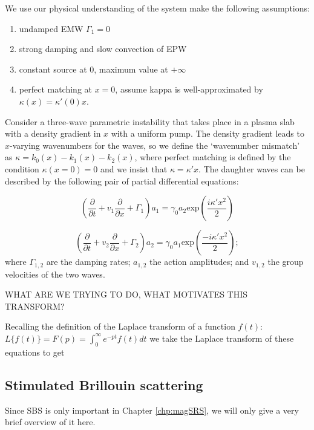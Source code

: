 We use our physical understanding of the system make the following assumptions:
\begin{enumerate}
	\item undamped EMW $\Gamma_1 = 0$
	\item strong damping and slow convection of EPW
	\item constant source at 0, maximum value at $+\infty$
	\item perfect matching at $x=0$, assume kappa is well-approximated by 
	$\kappa(x) = \kappa'(0)x$.
\end{enumerate}

Consider a three-wave parametric instability that takes place in a plasma slab with a density gradient in $x$ with a uniform pump. The density gradient leads to $x$-varying wavenumbers for the waves, so we define the `wavenumber mismatch' as $\kappa = k_0(x) - k_1(x) - k_2(x)$, where perfect matching is defined by the condition $\kappa(x=0) = 0$ and we insist that $\kappa = \kappa' x$. The daughter waves can be described by the following pair of partial differential equations:

\begin{equation}
 \left(\frac{\partial}{\partial t} + v_1\frac{\partial}{\partial x} + \Gamma_1 \right)a_1 = \gamma_0a_2\text{exp}\left(\frac{i\kappa'x^2}{2}\right)
\end{equation}

\begin{equation}
 \left(\frac{\partial}{\partial t} + v_2\frac{\partial}{\partial x} + \Gamma_2 \right)a_2 = \gamma_0a_1\text{exp}\left(\frac{-i\kappa'x^2}{2}\right);
\end{equation} 
where $\Gamma_{1,2}$ are the damping rates; $a_{1,2}$ the action amplitudes; and $v_{1,2}$ the group velocities of the two waves. 

WHAT ARE WE TRYING TO DO, WHAT MOTIVATES THIS TRANSFORM?

Recalling the definition of the Laplace transform of a function $f(t)$: $L\{f(t)\}= F(p) = \int_0^\infty e^{-pt} f(t) dt$ we take the Laplace transform of these equations to get






\subsection{Stimulated Brillouin scattering}
Since SBS is only important in Chapter \ref{chp:magSRS}, we will only give a very brief overview of it here.


